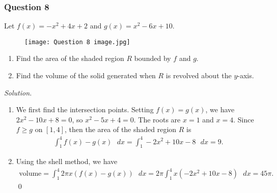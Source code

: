 \documentclass[12pt]{article}
\begin{document}
\subsubsection*{Question 8}
Let $f\left(x\right)=-x^2+4x+2$ and $g\left(x\right)=x^2-6x+10$.
\begin{figure}[h!]
        \centering
        \texttt{[image: Question 8 image.jpg]}
    \end{figure}
\begin{enumerate}[label=\textbf{(\alph*)}]
    \itemsep 0em
    \item Find the area of the shaded region $R$ bounded by $f$ and $g$.
    \item Find the volume of the solid generated when $R$ is revolved about the $y$-axis.
\end{enumerate}
\textit{Solution.}
\begin{enumerate}[label=\textbf{(\alph*)}]
    \itemsep 0em
    \item We first find the intersection points. Setting $f\left(x\right)=g\left(x\right)$, we have $2x^2-10x+8=0$, so $x^2-5x+4=0$. The roots are $x=1$ and $x=4$. Since $f\ge g$ on $\left[1,4\right]$, then the area of the shaded region $R$ is \begin{align*}
        \int_{1}^{4}f\left(x\right)-g\left(x\right)\text{ }dx=\int_{1}^{4}-2x^{2}+10x-8\text{ }dx=9.
    \end{align*}
    \item Using the shell method, we have \begin{align*}
        \text{volume}=\int_{1}^{4}2\pi x\left(f\left(x\right)-g\left(x\right)\right)\text{ }dx=2\pi\int_{1}^{4}x\left(-2x^2+10x-8\right)\text{ }dx=45\pi.
    \end{align*}\qed 
\end{enumerate}
\end{document}
